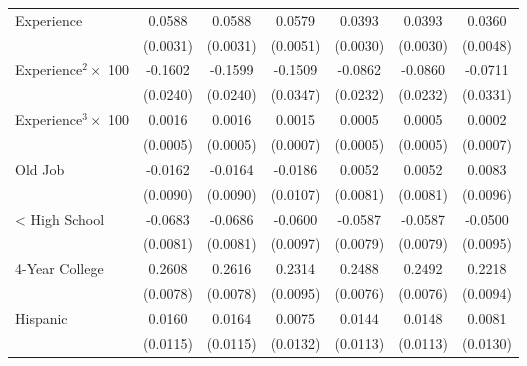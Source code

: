 {\begin{longtable}{l*{6}{c}}
Experience          &      0.0588\sym{***}&      0.0588\sym{***}&      0.0579\sym{***}&      0.0393\sym{***}&      0.0393\sym{***}&      0.0360\sym{***}\\
                    &    (0.0031)         &    (0.0031)         &    (0.0051)         &    (0.0030)         &    (0.0030)         &    (0.0048)         \\
Experience$^2\times$ 100&     -0.1602\sym{***}&     -0.1599\sym{***}&     -0.1509\sym{***}&     -0.0862\sym{***}&     -0.0860\sym{***}&     -0.0711\sym{**} \\
                    &    (0.0240)         &    (0.0240)         &    (0.0347)         &    (0.0232)         &    (0.0232)         &    (0.0331)         \\
Experience$^3\times$ 100&      0.0016\sym{***}&      0.0016\sym{***}&      0.0015\sym{**} &      0.0005         &      0.0005         &      0.0002         \\
                    &    (0.0005)         &    (0.0005)         &    (0.0007)         &    (0.0005)         &    (0.0005)         &    (0.0007)         \\
Old Job             &     -0.0162\sym{*}  &     -0.0164\sym{*}  &     -0.0186\sym{*}  &      0.0052         &      0.0052         &      0.0083         \\
                    &    (0.0090)         &    (0.0090)         &    (0.0107)         &    (0.0081)         &    (0.0081)         &    (0.0096)         \\
< High School       &     -0.0683\sym{***}&     -0.0686\sym{***}&     -0.0600\sym{***}&     -0.0587\sym{***}&     -0.0587\sym{***}&     -0.0500\sym{***}\\
                    &    (0.0081)         &    (0.0081)         &    (0.0097)         &    (0.0079)         &    (0.0079)         &    (0.0095)         \\
4-Year College      &      0.2608\sym{***}&      0.2616\sym{***}&      0.2314\sym{***}&      0.2488\sym{***}&      0.2492\sym{***}&      0.2218\sym{***}\\
                    &    (0.0078)         &    (0.0078)         &    (0.0095)         &    (0.0076)         &    (0.0076)         &    (0.0094)         \\
Hispanic            &      0.0160         &      0.0164         &      0.0075         &      0.0144         &      0.0148         &      0.0081         \\
                    &    (0.0115)         &    (0.0115)         &    (0.0132)         &    (0.0113)         &    (0.0113)         &    (0.0130)         \\

\end{longtable}}
